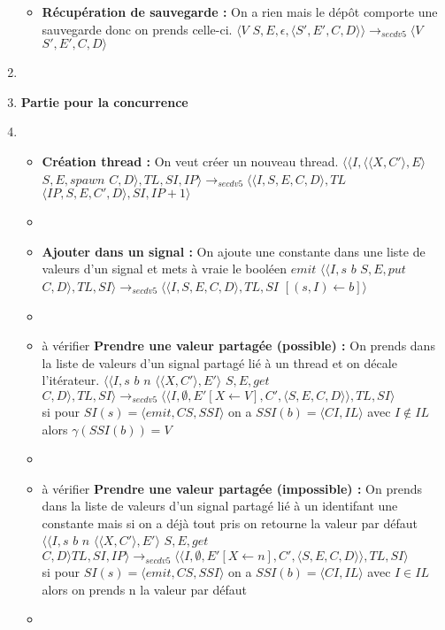 \documentclass[10pt,a4paper]{article}
\begin{document}
\begin{enumerate}
\begin{itemize}
				\item[] \textbf{Récupération de sauvegarde :}  On a rien mais le dépôt comporte une sauvegarde donc on prends celle-ci.
				\smallbreak  
				$\langle V$ $S,E,\epsilon,\langle S',E',C,D\rangle\rangle
				\longrightarrow_{secdv5} 
				\langle V$ $S',E',C,D\rangle$
			\end{itemize}
			\item[]
			
			
			
			\item[] \textbf{Partie pour la concurrence} 
			\item[]
			\begin{itemize}
				\item[]  \textbf{Création thread :} On veut créer un nouveau thread.
				\smallbreak 
				$\langle\langle I,\langle\langle X,C'\rangle, E\rangle$ $S,E,spawn$ $C,D\rangle,TL,SI,IP\rangle 
				\longrightarrow_{secdv5} 
				\langle\langle I,S,E,C,D\rangle,TL$ $\langle IP,S,E,C',D\rangle,SI,IP+1\rangle$
				\item[]
				
				\item[] \textbf{Ajouter dans un signal :} On ajoute une constante dans une liste de valeurs d'un signal et mets à vraie le booléen $emit$
				\smallbreak
				$\langle\langle I,s$ $b$ $S,E,put$ $C,D\rangle,TL,SI\rangle
				\longrightarrow_{secdv5} 
				\langle\langle I,S,E,C,D\rangle,TL,SI$ $[(s,I) \leftarrow b]\rangle$ 
				\item[]
				
				\item[] à vérifier \textbf{Prendre une valeur partagée (possible) :} On prends dans la liste de valeurs d'un signal partagé lié à un thread et on décale l'itérateur.
				\smallbreak
				$\langle\langle I,s$ $b$ $n$ $\langle\langle X,C'\rangle,E'\rangle$ $S,E,get$ $C,D\rangle,TL,SI\rangle 
				\longrightarrow_{secdv5} 
				\langle\langle I,\emptyset,E'[X \leftarrow V],C',\langle S,E,C,D\rangle\rangle,TL,SI\rangle$
				\\ si pour $SI(s) = \langle emit,CS,SSI\rangle$ on a $SSI(b) = \langle CI,IL\rangle$ avec $I \notin IL$ alors $\gamma(SSI(b)) = V$
				\item[]
				
				\item[] à vérifier \textbf{Prendre une valeur partagée (impossible) :} On prends dans la liste de valeurs d'un signal partagé lié à un identifant une constante mais si on a déjà tout pris on retourne la valeur par défaut
				\smallbreak 
				$\langle\langle I,s$ $b$ $n$ $\langle\langle X,C'\rangle,E'\rangle$ $S,E,get$ $C,D\rangle TL,SI,IP\rangle 
				\longrightarrow_{secdv5} 
				\langle\langle I,\emptyset,E'[X \leftarrow n],C',\langle S,E,C,D\rangle\rangle,TL,SI\rangle$
				\\ si pour $SI(s) = \langle emit,CS,SSI\rangle$ on a $SSI(b) = \langle CI,IL\rangle$ avec $I \in IL$ alors on prends n la valeur par défaut
				\item[]
				

\end{itemize}
\end{enumerate}
\end{document}

